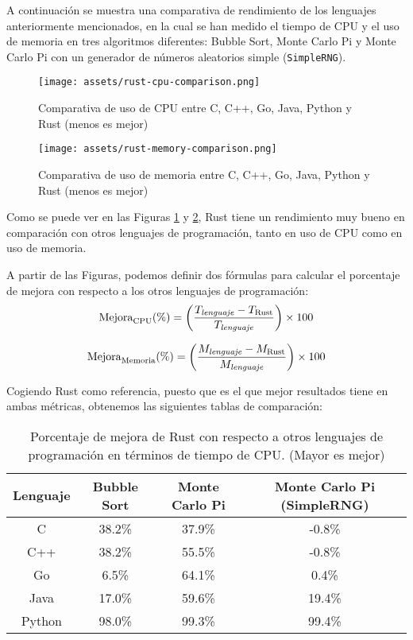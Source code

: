 A continuación se muestra una comparativa de rendimiento de los lenguajes anteriormente mencionados, en la cual se han medido el tiempo de CPU y el uso de memoria en tres algoritmos diferentes: Bubble Sort, Monte Carlo Pi y Monte Carlo Pi con un generador de números aleatorios simple (\texttt{SimpleRNG}).

\begin{figure}[H]
  \centering
  \texttt{[image: assets/rust-cpu-comparison.png]}
  \caption{Comparativa de uso de CPU entre C, C++, Go, Java, Python y Rust (menos es mejor) \parencite{rust-for-safety-and-performance}}
  \label{fig:rust-cpu-comparison}
\end{figure}


\begin{figure}[H]
  \centering
  \texttt{[image: assets/rust-memory-comparison.png]}
  \caption{Comparativa de uso de memoria entre C, C++, Go, Java, Python y Rust (menos es mejor) \parencite{rust-for-safety-and-performance}}
  \label{fig:rust-memory-comparison}
\end{figure}

Como se puede ver en las Figuras \ref{fig:rust-cpu-comparison} y \ref{fig:rust-memory-comparison}, Rust tiene un rendimiento muy bueno en comparación con otros lenguajes de programación, tanto en uso de CPU como en uso de memoria.

A partir de las Figuras, podemos definir dos fórmulas para calcular el porcentaje de mejora con respecto a los otros lenguajes de programación:
\begin{equation}
    \text{Mejora}_{\text{CPU}} (\%) = \left( \frac{T_{\text{\textit{lenguaje}}} - T_{\text{Rust}}}{T_{\text{\textit{lenguaje}}}} \right) \times 100
\end{equation}

\begin{equation}
    \text{Mejora}_{\text{Memoria}} (\%) = \left( \frac{M_{\text{\textit{lenguaje}}} - M_{\text{Rust}}}{M_{\text{\textit{lenguaje}}}} \right) \times 100
\end{equation}


Cogiendo Rust como referencia, puesto que es el que mejor resultados tiene en ambas métricas, obtenemos las siguientes tablas de comparación:

\begin{table}[H]
\centering
\begin{tabular}{|c|c|c|c|}
\hline
\textbf{Lenguaje} & \textbf{Bubble Sort} & \textbf{Monte Carlo Pi} & \textbf{Monte Carlo Pi (SimpleRNG)} \\
\hline
C      & 38.2\%  & 37.9\%  & -0.8\% \\
C++    & 38.2\%  & 55.5\%  & -0.8\% \\
Go     & 6.5\%   & 64.1\%  & 0.4\%           \\
Java   & 17.0\%  & 59.6\%  & 19.4\%          \\
Python & 98.0\%  & 99.3\%  & 99.4\%          \\
\hline
\end{tabular}
\caption{Porcentaje de mejora de Rust con respecto a otros lenguajes de programación en términos de tiempo de CPU. (Mayor es mejor)}
\end{table}

